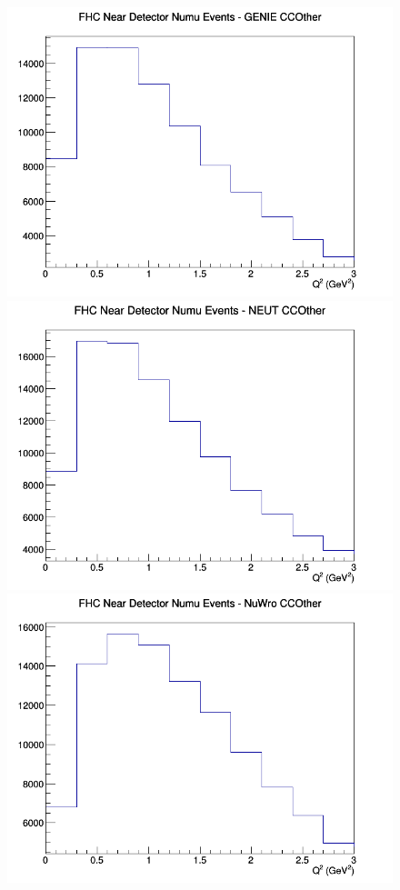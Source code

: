 \documentclass[12pt]{article}
\begin{document}
\begin{figure}[h]
\centering
{}
\includegraphics[width=\linewidth]{Q2/nominal/CCOther_FHC_ND_numu_Q2_GENIE.png}
\endminipage
{}
\includegraphics[width=\linewidth]{Q2/nominal/CCOther_FHC_ND_numu_Q2_NEUT.png}
\endminipage
{}
\includegraphics[width=\linewidth]{Q2/nominal/CCOther_FHC_ND_numu_Q2_NuWro.png}

\end{figure}
\end{document}
